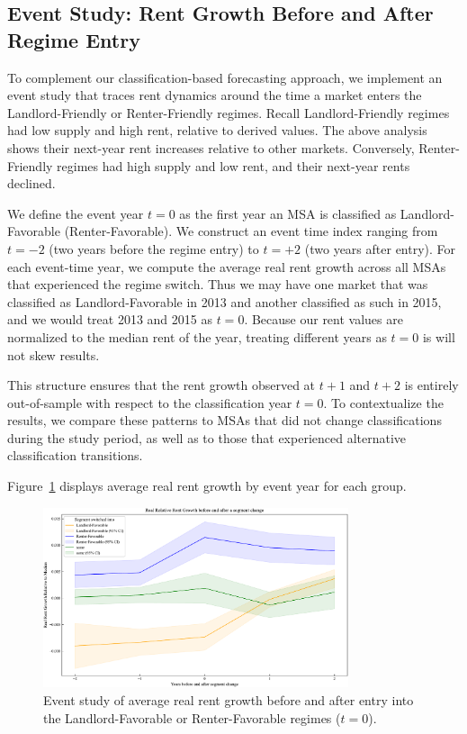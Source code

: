 \documentclass[APA,Times1COL]{WileyNJDv5} %
\begin{document}
\subsection{Event Study: Rent Growth Before and After Regime Entry}

To complement our classification-based forecasting approach, we implement an event study that traces rent dynamics around the time a market enters the Landlord-Friendly or Renter-Friendly regimes. Recall Landlord-Friendly regimes had low supply and high rent, relative to derived values. The above analysis shows their next-year rent increases relative to other markets. Conversely, Renter-Friendly regimes had high supply and low rent, and their next-year rents declined. 

We define the event year $t=0$ as the first year an MSA is classified as Landlord-Favorable (Renter-Favorable). We construct an event time index ranging from $t = -2$ (two years before the regime entry) to $t = +2$ (two years after entry). For each event-time year, we compute the average real rent growth across all MSAs that experienced the regime switch. Thus we may have one market that was classified as Landlord-Favorable in 2013 and another classified as such in 2015, and we would treat 2013 and 2015 as $t=0$. Because our rent values are normalized to the median rent of the year, treating different years as $t=0$ is will not skew results.

This structure ensures that the rent growth observed at $t+1$ and $t+2$ is entirely out-of-sample with respect to the classification year $t=0$. To contextualize the results, we compare these patterns to MSAs that did not change classifications during the study period, as well as to those that experienced alternative classification transitions.

Figure~\ref{fig:event_study} displays average real rent growth by event year for each group.

\begin{figure}[h]
	\centering
	\includegraphics[width=0.8\textwidth]{event_study.pdf}
	\caption{Event study of average real rent growth before and after entry into the Landlord-Favorable or Renter-Favorable regimes ($t=0$).}
	\label{fig:event_study}
\end{figure}
\end{document}
